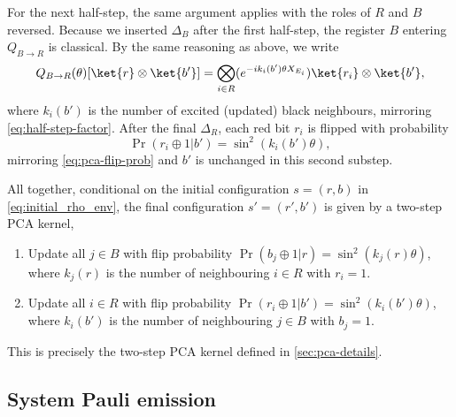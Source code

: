 For the next half-step, the same argument applies with the roles of \(R\) and \(B\) reversed. Because we inserted \(\Delta_B\) after the first half-step, the register \(B\) entering \(Q_{B \to R}\) is classical. By the same reasoning as above, we write
\begin{equation}
    Q_{B \to R}(\theta)[\ket{r} \otimes \ket{b'}] = \bigotimes_{i \in R} (e^{-ik_i(b')\theta X_{E_i}}) \ket{r_i} \otimes \ket{b'},
\end{equation}
where \(k_i(b')\) is the number of excited (updated) black neighbours, mirroring \cref{eq:half-step-factor}. After the final \(\Delta_R\), each red bit \(r_i\) is flipped with probability 
\begin{equation}
    \Pr(r_i \oplus 1 | b') = \sin^2(k_i(b') \theta),
\end{equation}
mirroring \cref{eq:pca-flip-prob} and \(b'\) is unchanged in this second substep.

All together, conditional on the initial configuration \(s = (r,b)\) in \cref{eq:initial_rho_env}, the final configuration \(s' = (r',b')\) is given by a two-step PCA kernel,
\begin{enumerate}
    \item Update all \(j \in B\) with flip probability \(\Pr(b_j \oplus 1 | r) = \sin^2(k_j(r) \theta)\), where \(k_j(r)\) is the number of neighbouring \(i \in R\) with \(r_i = 1\).
    \item Update all \(i \in R\) with flip probability \(\Pr(r_i \oplus 1 | b') = \sin^2(k_i(b') \theta)\), where \(k_i(b')\) is the number of neighbouring \(j \in B\) with \(b_j = 1\).
\end{enumerate}
This is precisely the two-step PCA kernel defined in \cref{sec:pca-details}.

\subsection{System Pauli emission}